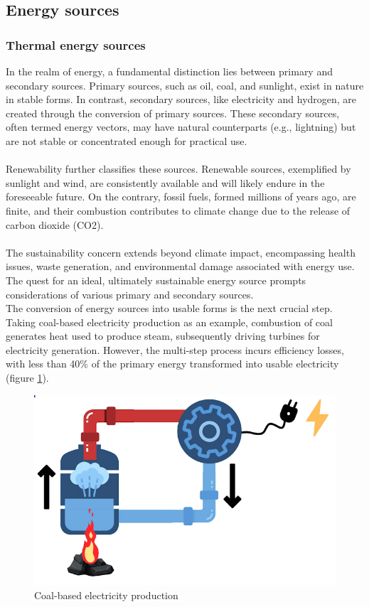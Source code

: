 \documentclass[../summary.tex]{subfiles}
\begin{document}
\subsection{Energy sources}
\subsubsection{Thermal energy sources}

In the realm of energy, a fundamental distinction lies between primary and secondary sources. Primary sources, such as oil, coal, and sunlight, exist in nature in stable forms. In contrast, secondary sources, like electricity and hydrogen, are created through the conversion of primary sources. These secondary sources, often termed energy vectors, may have natural counterparts (e.g., lightning) but are not stable or concentrated enough for practical use.\\
\\
Renewability further classifies these sources. Renewable sources, exemplified by sunlight and wind, are consistently available and will likely endure in the foreseeable future. On the contrary, fossil fuels, formed millions of years ago, are finite, and their combustion contributes to climate change due to the release of carbon dioxide (CO2).\\
\\
The sustainability concern extends beyond climate impact, encompassing health issues, waste generation, and environmental damage associated with energy use. The quest for an ideal, ultimately sustainable energy source prompts considerations of various primary and secondary sources.
\newpage
\ \\
The conversion of energy sources into usable forms is the next crucial step. Taking coal-based electricity production as an example, combustion of coal generates heat used to produce steam, subsequently driving turbines for electricity generation. However, the multi-step process incurs efficiency losses, with less than 40\% of the primary energy transformed into usable electricity (figure \ref{fig:coalbasedelectricityproduction}).


\begin{figure}[H]
	\centering
	\includegraphics[width=0.7\linewidth]{../images/coal_based_electricity_production}
	\caption{Coal-based electricity production}
	\label{fig:coalbasedelectricityproduction}
\end{figure}
\end{document}

